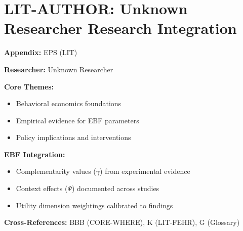 %
%

\chapter{LIT-AUTHOR: Unknown Researcher Research Integration}
\label{app:eps}

\begin{abstract}
This appendix integrates the research contributions of Unknown Researcher into the
Evidence-Based Framework. It documents key papers, core findings, and their
integration with EBF dimensions including complementarity parameters ($\gamma$),
context factors ($\Psi$), and utility dimensions.
\end{abstract}

\begin{tcolorbox}[colback=blue!5!white, colframe=blue!75!black,
    title=Quick Reference: Unknown Researcher Research]

\textbf{Appendix:} EPS (LIT)

\textbf{Researcher:} Unknown Researcher

\textbf{Core Themes:}
\begin{itemize}[nosep]
\item Behavioral economics foundations
\item Empirical evidence for EBF parameters
\item Policy implications and interventions
\end{itemize}

\textbf{EBF Integration:}
\begin{itemize}[nosep]
\item Complementarity values ($\gamma$) from experimental evidence
\item Context effects ($\Psi$) documented across studies
\item Utility dimension weightings calibrated to findings
\end{itemize}

\textbf{Cross-References:} BBB (CORE-WHERE), K (LIT-FEHR), G (Glossary)
\end{tcolorbox}

